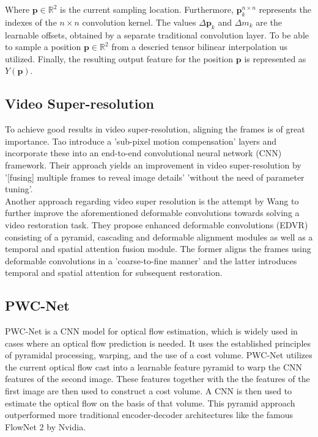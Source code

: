 \documentclass[10pt,twocolumn,letterpaper]{article}
\newcommand{\Vector}[1]{\boldsymbol{#1}}
\newcommand{\Set}[1]{\mathbb{#1}}
\begin{document}
	Where $\Vector{p}\in\Set{R}^2$ is the current sampling location. Furthermore, $\Vector{p}_{k}^{n\times n}$ represents the indexes of the $n\times n$ convolution kernel. The values $\Delta\Vector{p}_{k}$ and $\Delta m_{k}$ are the learnable offsets, obtained by a separate traditional convolution layer. To be able to sample a position $\Vector{p}\in\Set{R}^2$ from a descried tensor bilinear interpolation us utilized. Finally, the resulting output feature for the position $\Vector{p}$ is represented as $Y\left(\Vector{p}\right)$. \cite{deformableconv}
	
	\subsection{Video Super-resolution}
	To achieve good results in video super-resolution, aligning the frames is of great importance. Tao \etal \cite{valillasuperres} introduce a 'sub-pixel motion compensation' layers and incorporate these into an end-to-end convolutional neural network (CNN) framework. Their approach yields an improvement in video super-resolution by '[fusing] multiple frames to reveal image details' 'without the need of parameter tuning'. \cite{valillasuperres}\\
	
	Another approach regarding video super resolution is the attempt by Wang \etal \cite{deformablesuperres} to further improve the aforementioned deformable convolutions towards solving a video restoration task. They propose enhanced deformable convolutions (EDVR) consisting of a pyramid, cascading and deformable alignment modules as well as a temporal and spatial attention fusion module. The former aligns the frames using deformable convolutions in a 'coarse-to-fine manner' and the latter introduces temporal and spatial attention for subsequent restoration. \cite{deformablesuperres}
	
	\subsection{PWC-Net}
	PWC-Net \cite{pwcnet} is a CNN model for optical flow estimation, which is widely used in cases where an optical flow prediction is needed. It uses the established principles of pyramidal processing, warping, and the use of a cost volume. PWC-Net utilizes the current optical flow cast into a learnable feature pyramid to warp the CNN features of the second image. These features together with the the features of the first image are then used to construct a cost volume. A CNN is then used to estimate the optical flow on the basis of that volume. This pyramid approach outperformed more traditional encoder-decoder architectures like the famous FlowNet 2 \cite{flownet2} by Nvidia. \cite{pwcnet}
	
\end{document}
